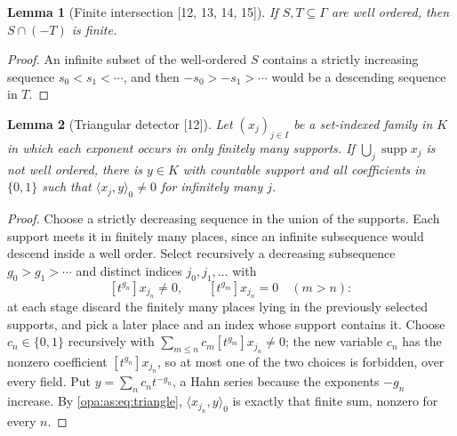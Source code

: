 \documentclass[11pt,oneside]{article}
\numberwithin{equation}{section}
\newtheorem{lemma}[lemma]{Lemma}
\theoremstyle{definition}
\theoremstyle{remark}
\newcommand{\supp}{\operatorname{supp}}
\newcommand{\coef}[2]{[t^{#1}]#2}
\newcommand{\src}[1]{\textup{\textsf{\small[#1]}}}
\newcommand{\pairing}[2]{\langle #1,#2\rangle_0}
\begin{document}
\begin{lemma}[Finite intersection \src{12, 13, 14, 15}]\label{opa:as:lem:intersection}
If $S,T\subseteq\Gamma$ are well ordered, then $S\cap(-T)$ is finite.
\end{lemma}
\begin{proof}
An infinite subset of the well-ordered $S$ contains a strictly increasing sequence
$s_0<s_1<\cdots$, and then $-s_0>-s_1>\cdots$ would be a descending sequence in $T$.
\end{proof}

\begin{lemma}[Triangular detector \src{12}]\label{opa:as:lem:triangular}
Let $(x_j)_{j\in I}$ be a set-indexed family in $K$ in which each exponent occurs in only
finitely many supports. If $\bigcup_j\supp x_j$ is not well ordered, there is
$y\in K$ with countable support and all coefficients in $\{0,1\}$ such that
$\pairing{x_j}y\ne0$ for infinitely many $j$.
\end{lemma}
\begin{proof}
Choose a strictly decreasing sequence in the union of the supports. Each support meets it
in finitely many places, since an infinite subsequence would descend inside a well order.
Select recursively a decreasing subsequence $g_0>g_1>\cdots$ and distinct indices
$j_0,j_1,\ldots$ with
\begin{equation}\label{opa:as:eq:triangle}
 \coef{g_n}{x_{j_n}}\ne0,\qquad \coef{g_m}{x_{j_n}}=0\quad(m>n):
\end{equation}
at each stage discard the finitely many places lying in the previously selected
supports, and pick a later place and an index whose support contains it. Choose
$c_n\in\{0,1\}$ recursively with $\sum_{m\le n}c_m\coef{g_m}{x_{j_n}}\ne0$; the new
variable $c_n$ has the nonzero coefficient $\coef{g_n}{x_{j_n}}$, so at most one of the
two choices is forbidden, over every field. Put $y=\sum_nc_nt^{-g_n}$, a Hahn series
because the exponents $-g_n$ increase. By \eqref{opa:as:eq:triangle},
$\pairing{x_{j_n}}y$ is exactly that finite sum, nonzero for every $n$.
\end{proof}
\end{document}
